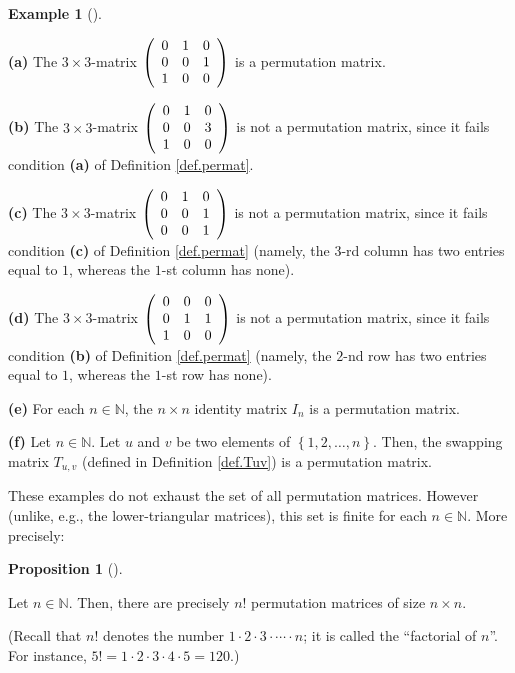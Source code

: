 \documentclass[numbers=enddot,12pt,final,onecolumn,notitlepage]{scrartcl}%
\theoremstyle{definition}
\newtheorem{prop}[theo]{Proposition}
\newenvironment{proposition}[1][]
{\begin{prop}[#1]\begin{leftbar}}
{\end{leftbar}\end{prop}}
\newtheorem{exam}[theo]{Example}
\newenvironment{example}[1][]
{\begin{exam}[#1]\begin{leftbar}}
{\end{leftbar}\end{exam}}
\begin{document}
\begin{example}
\label{exam.permat}\textbf{(a)} The $3\times3$-matrix $\left(
\begin{array}
[c]{ccc}%
0 & 1 & 0\\
0 & 0 & 1\\
1 & 0 & 0
\end{array}
\right)  $ is a permutation matrix.

\textbf{(b)} The $3\times3$-matrix $\left(
\begin{array}
[c]{ccc}%
0 & 1 & 0\\
0 & 0 & 3\\
1 & 0 & 0
\end{array}
\right)  $ is not a permutation matrix, since it fails condition \textbf{(a)}
of Definition \ref{def.permat}.

\textbf{(c)} The $3\times3$-matrix $\left(
\begin{array}
[c]{ccc}%
0 & 1 & 0\\
0 & 0 & 1\\
0 & 0 & 1
\end{array}
\right)  $ is not a permutation matrix, since it fails condition \textbf{(c)}
of Definition \ref{def.permat} (namely, the $3$-rd column has two entries
equal to $1$, whereas the $1$-st column has none).

\textbf{(d)} The $3\times3$-matrix $\left(
\begin{array}
[c]{ccc}%
0 & 0 & 0\\
0 & 1 & 1\\
1 & 0 & 0
\end{array}
\right)  $ is not a permutation matrix, since it fails condition \textbf{(b)}
of Definition \ref{def.permat} (namely, the $2$-nd row has two entries equal
to $1$, whereas the $1$-st row has none).

\textbf{(e)} For each $n\in\mathbb{N}$, the $n\times n$ identity matrix
$I_{n}$ is a permutation matrix.

\textbf{(f)} Let $n\in\mathbb{N}$. Let $u$ and $v$ be two elements of
$\left\{  1,2,\ldots,n\right\}  $. Then, the swapping matrix $T_{u,v}$
(defined in Definition \ref{def.Tuv}) is a permutation matrix.
\end{example}

These examples do not exhaust the set of all permutation matrices. However
(unlike, e.g., the lower-triangular matrices), this set is finite for each
$n\in\mathbb{N}$. More precisely:

\begin{proposition}
\label{prop.permat.n!}Let $n\in\mathbb{N}$. Then, there are precisely $n!$
permutation matrices of size $n\times n$.

(Recall that $n!$ denotes the number $1\cdot2\cdot3\cdot\cdots\cdot n$; it is
called the \textquotedblleft factorial of $n$\textquotedblright. For instance,
$5!=1\cdot2\cdot3\cdot4\cdot5=120$.)
\end{proposition}
\end{document}
